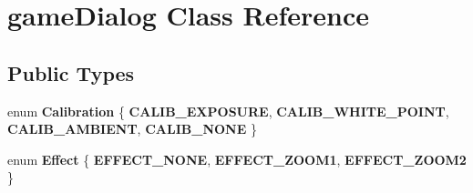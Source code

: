\hypertarget{classgameDialog}{\section{game\-Dialog \-Class \-Reference}
\label{classgameDialog}
}
\subsection*{\-Public \-Types}
\begin{DoxyCompactItemize}
\item 
enum {\bfseries \-Calibration} \{ {\bfseries \-C\-A\-L\-I\-B\-\_\-\-E\-X\-P\-O\-S\-U\-R\-E}, 
{\bfseries \-C\-A\-L\-I\-B\-\_\-\-W\-H\-I\-T\-E\-\_\-\-P\-O\-I\-N\-T}, 
{\bfseries \-C\-A\-L\-I\-B\-\_\-\-A\-M\-B\-I\-E\-N\-T}, 
{\bfseries \-C\-A\-L\-I\-B\-\_\-\-N\-O\-N\-E}
 \}
\item 
enum {\bfseries \-Effect} \{ {\bfseries \-E\-F\-F\-E\-C\-T\-\_\-\-N\-O\-N\-E}, 
{\bfseries \-E\-F\-F\-E\-C\-T\-\_\-\-Z\-O\-O\-M1}, 
{\bfseries \-E\-F\-F\-E\-C\-T\-\_\-\-Z\-O\-O\-M2}
 \}
\end{DoxyCompactItemize}
